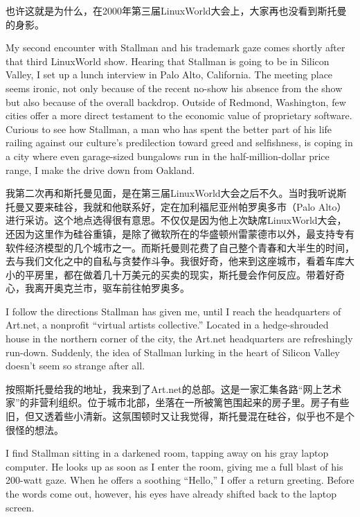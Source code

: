 \ifdefined\chs
也许这就是为什么，在2000年第三届LinuxWorld大会上，大家再也没看到斯托曼的身影。
\fi

\ifdefined\eng
My second encounter with Stallman and his trademark gaze comes shortly after that third LinuxWorld show. Hearing that Stallman is going to be in Silicon Valley, I set up a lunch interview in Palo Alto, California. The meeting place seems ironic, not only because of \ifdefined\vone the recent no-show \fi\ifdefined\vtwo his absence from the show \fi but also because of the overall backdrop. Outside of Redmond, Washington, few cities offer a more direct testament to the economic value of proprietary software. Curious to see how Stallman, a man who has spent the better part of his life railing against our culture's predilection toward greed and selfishness, is coping in a city where even garage-sized bungalows run in the half-million-dollar price range, I make the drive down from Oakland.
\fi

\ifdefined\chs
我第二次再和斯托曼见面，是在第三届LinuxWorld大会之后不久。当时我听说斯托曼又要来硅谷，我就和他联系好，定在加利福尼亚州帕罗奥多市（Palo Alto）进行采访。这个地点选得很有意思。不仅仅是因为他上次缺席LinuxWorld大会，还因为这里作为硅谷重镇，是除了微软所在的华盛顿州雷蒙德市以外，最支持专有软件经济模型的几个城市之一。而斯托曼则花费了自己整个青春和大半生的时间，去与我们文化之中的自私与贪婪作斗争。我很好奇，他来到这座城市，看着车库大小的平房里，都在做着几十万美元的买卖的现实，斯托曼会作何反应。带着好奇心，我离开奥克兰市，驱车前往帕罗奥多。
\fi

\ifdefined\eng
I follow the directions Stallman has given me, until I reach the headquarters of Art.net, a nonprofit ``virtual artists collective.'' Located in a hedge-shrouded house in the northern corner of the city, the Art.net headquarters are refreshingly run-down. Suddenly, the idea of Stallman lurking in the heart of Silicon Valley doesn't seem so strange after all.
\fi

\ifdefined\chs
按照斯托曼给我的地址，我来到了Art.net的总部。这是一家汇集各路``网上艺术家''的非营利组织。位于城市北部，坐落在一所被篱笆围起来的房子里。房子有些旧，但又透着些小清新。这氛围顿时又让我觉得，斯托曼混在硅谷，似乎也不是个很怪的想法。
\fi

\ifdefined\eng
I find Stallman sitting in a darkened room, tapping away on his gray laptop computer. He looks up as soon as I enter the room, giving me a full blast of his 200-watt gaze. When he offers a soothing ``Hello,'' I offer a return greeting. Before the words come out, however, his eyes have already shifted back to the laptop screen.
\fi

